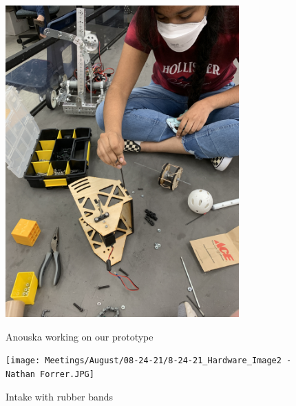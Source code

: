 \begin{figure}[ht]
\centering
\begin{minipage}[b]{.50\textwidth}
  \centering
  \includegraphics[width=0.8\textwidth]{Meetings/August/08-24-21/8-24-21_Hardware_Image1 - Nathan Forrer.JPG}
  \caption{Anouska working on our prototype}
  \label{fig:pic1}
\end{minipage}%
\hfill%
\begin{minipage}[b]{.50\textwidth}
  \centering
  \texttt{[image: Meetings/August/08-24-21/8-24-21\_Hardware\_Image2 - Nathan Forrer.JPG]}
  \caption{Intake with rubber bands}
  \label{fig:pic2}
\end{minipage}
\end{figure}

